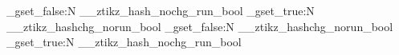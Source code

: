 \NewDocumentCommand{\ztikzForceToSkip}{}
  {
    \bool_gset_false:N \g__ztikz_hash_nochg_run_bool
    \bool_gset_true:N \g__ztikz_hashchg_norun_bool
  }
\NewDocumentCommand{\ztikzForceToRun}{}
  {
    \bool_gset_false:N \g__ztikz_hashchg_norun_bool
    \bool_gset_true:N \g__ztikz_hash_nochg_run_bool
  }